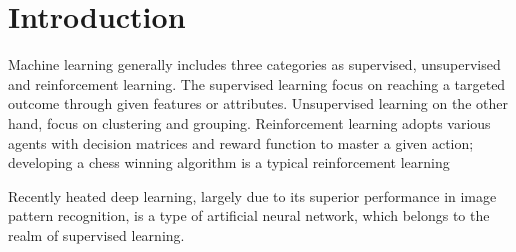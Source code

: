 \section{Introduction}

Machine learning generally includes three categories as supervised, unsupervised and reinforcement learning. The supervised learning focus on reaching a targeted outcome through given features or attributes. Unsupervised learning on the other hand, focus on clustering and grouping. Reinforcement learning adopts various agents with decision matrices and reward function to master a given action; developing a chess winning algorithm is a typical reinforcement learning
\par
Recently heated deep learning, largely due to its superior performance in image pattern recognition, is a type of artificial neural network, which belongs to the realm of supervised learning. 
